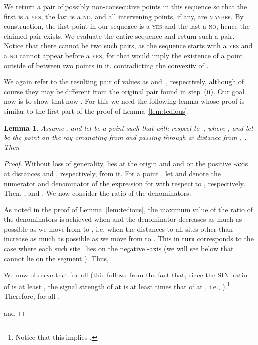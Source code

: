 \documentclass[11pt]{article}
\newtheorem{lemma}[theorem]{Lemma}
\theoremstyle{remark}
\begin{document}
\begin{enumerate}[(i)]
We return a pair of possibly non-consecutive points in this sequence so that the first is a \textsc{yes}, the last is a \textsc{no}, and all intervening points, if any, are \textsc{maybe}s.  By construction, the first point in our sequence is a \textsc{yes} and the last a \textsc{no}, hence the claimed pair exists.  We evaluate the entire sequence and return such a pair.  Notice that there cannot be two such pairs, as the sequence starts with a \textsc{yes} and a \textsc{no} cannot appear before a \textsc{yes}, for that would imply the existence of a point outside of  between two points in it, contradicting the convexity of .

We again refer to the resulting pair of values as  and~, respectively, although of course they may be different from the original  pair found in step~(ii). Our goal now is to show that now . For this we need the following lemma whose proof is similar to the first part of the proof of Lemma~\ref{lem:tedious}.
 
\begin{lemma}
\label{lem:also_tedious}
Assume , and
let  be a point such that  with respect to~, where , and
let  be the point on the ray emanating from  and passing through  at distance  from , .
Then 

\end{lemma}

\begin{proof}
  Without loss of generality,  lies at
  the origin and  and  on the positive -axis at distances  and , respectively, from it.
	For a point , let  and  denote the numerator and denominator of the expression for  with respect to , respectively.
  Then, , and
  . 
  We now consider the ratio  of the denominators.

  As noted in the proof of Lemma~\ref{lem:tedious},
the maximum value of the ratio of the denominators is achieved when  and the denominator  decreases as much as possible as we move from  to , i.e, when the distances to all sites other than  increase as much as possible as we move from  to . This in turn corresponds to the case where each such site~ lies on the negative -axis (we will see below that  cannot lie on the segment ). Thus,
  
  We now observe that
   for all  (this follows from the fact that, since the SIN~ratio of  is at least , the signal strength of  at  is at least  times that of  at , i.e., ).\footnote{
    Notice that this implies .}
  Therefore, for all ,
  
  and
  

\end{proof}
\end{enumerate}
\end{document}
